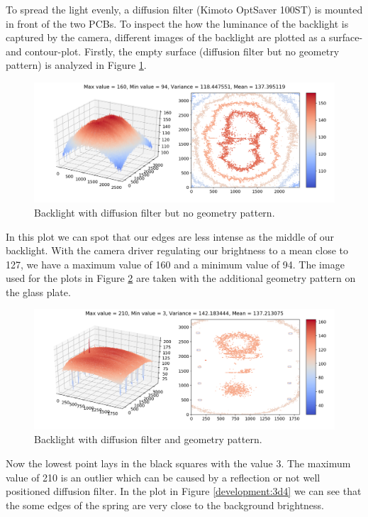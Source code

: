 To spread the light evenly, a diffusion filter (Kimoto OptSaver 100ST) is mounted in front of the two PCBs.
To inspect the how the luminance of the backlight is captured by the camera, different images of the backlight are plotted as a surface- and contour-plot.
Firstly, the empty surface (diffusion filter but no geometry pattern) is analyzed in Figure \ref{development:3d0}. 
\begin{figure}[ht]
	\centering
	\includegraphics[trim=50 0 0 0,clip,width=0.9\linewidth]{3-development/backlight/3d0.png}
	\caption{Backlight with diffusion filter but no geometry pattern.\label{development:3d0}}
\end{figure} 
In this plot we can spot that our edges are less intense as the middle of our backlight.
With the camera driver regulating our brightness to a mean close to 127, we have a maximum value of 160 and a minimum value of 94.
The image used for the plots in Figure \ref{development:3d1} are taken with the additional geometry pattern on the glass plate.
\begin{figure}[ht]
	\centering
	\includegraphics[trim=50 0 0 0,clip,width=0.9\linewidth]{3-development/backlight/3d1.png}
	\caption{Backlight with diffusion filter and geometry pattern.\label{development:3d1}}
\end{figure} 
Now the lowest point lays in the black squares with the value 3.
The maximum value of 210 is an outlier which can be caused by a reflection or not well positioned diffusion filter.
In the plot in Figure \ref{development:3d4} we can see that the some edges of the spring are very close to the background brightness.
